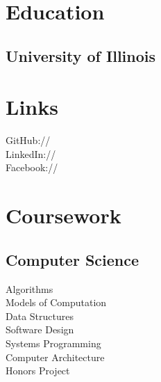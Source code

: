 \documentclass[]{deedy-resume-openfont}
\begin{document}
%
%
\lastupdated

%
%



%
%

\begin{minipage}[t]{0.33\textwidth}


\section{Education}

\subsection{University of Illinois}
\sectionsep


\section{Links}
GitHub:// \href{https://github.com/kylebegovich}{} \\
LinkedIn://  \href{https://www.linkedin.com/kyle-begovich}{} \\
Facebook://  \href{https://www.facebook.com/kyle.begovich.7}{}
\sectionsep


\section{Coursework}
\subsection{Computer Science}
Algorithms \\
Models of Computation \\
Data Structures \\
Software Design \\
Systems Programming\\
Computer Architecture \\
Honors Project \\
\sectionsep


\end{minipage}
\end{document}
